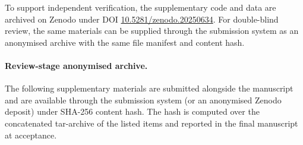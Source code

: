 \documentclass[acmsmall,screen,anonymous,review]{acmart}
\begin{document}
To support independent verification, the supplementary code and data are archived
on Zenodo under DOI \href{https://doi.org/10.5281/zenodo.20250634}{10.5281/zenodo.20250634}.
For double-blind review, the same materials can be supplied through the
submission system as an anonymised archive with the same file manifest and
content hash.

\paragraph{Review-stage anonymised archive.} The following supplementary materials are submitted alongside the manuscript and are available through the submission system (or an anonymised Zenodo deposit) under SHA-256 content hash. The hash is computed over the concatenated tar-archive of the listed items and reported in the final manuscript at acceptance.
\end{document}
